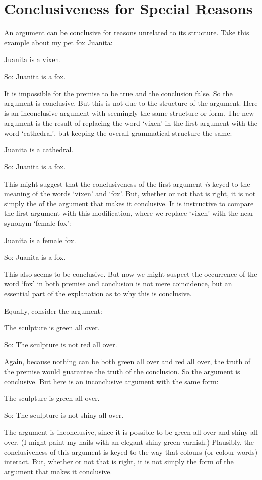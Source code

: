 \section{Conclusiveness for Special Reasons}
 An argument can be conclusive for reasons unrelated to its structure. Take this example about my pet fox Juanita:
 	\begin{earg}
 		\item[] Juanita is a vixen.
 		\item[So:] Juanita is a fox.
 	\end{earg}
 It is impossible for the premise to be true and the conclusion false. So the argument is conclusive. But this is not due to the structure of the argument. Here is an inconclusive argument with seemingly the same structure or form. The new argument is the result of replacing the word `vixen' in the first argument with the word `cathedral', but keeping the overall grammatical structure the same:
	\begin{earg}
		\item[] Juanita is a cathedral.
		\item[So:] Juanita is a fox.
	\end{earg}
This might suggest that the conclusiveness of the first argument \emph{is} keyed to the meaning of the words `vixen' and `fox'. But, whether or not that is right, it is not simply the  of the argument that makes it conclusive. It is instructive to compare the first argument with this modification, where we replace `vixen' with the near-synonym `female fox': 
\begin{earg}
 		\item[] Juanita is a female fox.
 		\item[So:] Juanita is a fox.
 	\end{earg} This also seems to be conclusive. But now we might suspect the occurrence of the word `fox' in both premise and conclusion is not mere coincidence, but an essential part of the explanation as to why this is conclusive.


Equally, consider the argument:
	\begin{earg}
		\item[] The sculpture is green all over.
		\item[So:] The sculpture is not red all over. 
	\end{earg}
Again, because nothing can be both green all over and red all over, the truth of the premise would guarantee the truth of the conclusion. So the argument is conclusive. But here is an inconclusive argument with the same form:
	\begin{earg}
		\item[] The sculpture is green all over.
		\item[So:] The sculpture is not shiny all over.
	\end{earg}
The argument is inconclusive, since it is possible to be green all over and shiny all over. (I might paint my nails with an elegant shiny green varnish.) Plausibly, the conclusiveness of this argument is keyed to the way that colours (or colour-words) interact. But, whether or not that is right, it is not simply the form of the argument that makes it conclusive. 

